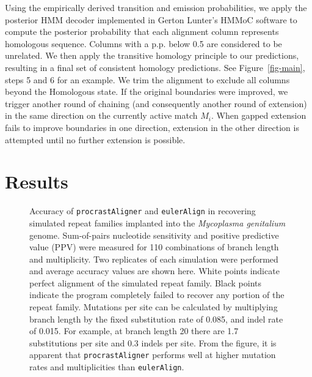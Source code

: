 \documentclass{ws-procs975x65}
\begin{document}
Using the empirically derived transition and emission probabilities, we apply the posterior HMM decoder implemented in Gerton Lunter's HMMoC software\cite{hmmoc} to compute the posterior probability that each alignment column represents homologous sequence.  Columns with a p.p. below 0.5 are considered to be unrelated.  We then apply the transitive homology principle to our predictions, resulting in a final set of consistent homology predictions.  See Figure~\ref{fig-main}, steps 5 and 6 for an example. We trim the alignment to exclude all columns beyond the Homologous state. If the original boundaries were improved, we trigger another round of chaining (and consequently another round of extension) in the same direction on the currently active match $M_i$.  When gapped extension fails to improve boundaries in one direction, extension in the other direction is attempted until no further extension is possible.


\section{Results}
\begin{figure}[t]
\centering {}
\caption{Accuracy of \texttt{procrastAligner} and \texttt{eulerAlign} in recovering simulated repeat families implanted into the \textit{Mycoplasma genitalium} genome.  Sum-of-pairs nucleotide sensitivity and positive predictive value (PPV) were measured for 110 combinations of branch length and multiplicity.  Two replicates of each simulation were performed and
average accuracy values are shown here.  White points indicate perfect alignment of the simulated repeat family.  Black points indicate the program completely failed to recover any portion of the repeat family.  Mutations per site can be calculated by multiplying branch length by the fixed substitution rate of 0.085, and indel rate of 0.015.  
For example, at branch length 20 there are 1.7 substitutions per site and 0.3 indels per site.
From the figure, it is apparent that \texttt{procrastAligner} performs well at higher mutation rates and multiplicities than \texttt{eulerAlign}.}
\label{fig-results}\vspace{-0.2cm}
\end{figure}


%
%
\end{document}

